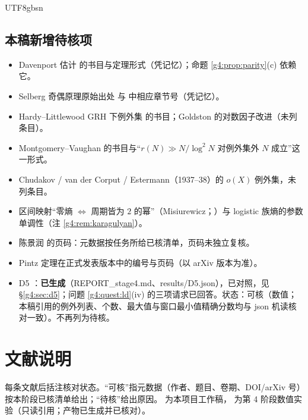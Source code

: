 \documentclass[11pt,a4paper]{article}
\theoremstyle{plain}
\theoremstyle{definition}
\begin{document}
\begin{CJK}{UTF8}{gbsn}
\subsection*{本稿新增待核项}
\begin{itemize}[leftmargin=*]
\item Davenport 估计 \cite{Dav37} 的书目与定理形式（凭记忆）；命题 \ref{g4:prop:parity}(c) 依赖它。
\item Selberg 奇偶原理原始出处 \cite{Sel49} 与 \cite{FI10} 中相应章节号（凭记忆）。
\item Hardy--Littlewood GRH 下例外集 \cite{HL24} 的书目；Goldston 的对数因子改进（未列条目）。
\item Montgomery--Vaughan \cite{MV75} 的书目与“$r(N)\gg N/\log^2N$ 对例外集外 $N$ 成立”这一形式。
\item Chudakov / van der Corput / Estermann（1937--38）的 $o(X)$ 例外集，未列条目。
\item 区间映射“零熵 $\iff$ 周期皆为 $2$ 的幂”（Misiurewicz；\cite{BC92}）与 logistic 族熵的参数单调性（注 \ref{g4:rem:karagulyan}）。
\item 陈景润 \cite{Chen73} 的页码：元数据按任务所给已核清单，页码未独立复核。
\item Pintz \cite{Pin18} 定理在正式发表版本中的编号与页码（以 arXiv 版本为准）。
\item D5 \cite{D5}：\textbf{已生成}（REPORT\_stage4.md、results/D5.json），已对照，见 \S\ref{g4:sec:d5}；问题 \ref{g4:quest:ld}(iv) 的三项请求已回答。状态：可核（数值；本稿引用的例外列表、个数、最大值与窗口最小值精确分数均与 json 机读核对一致）。不再列为待核。
\end{itemize}

\section*{文献说明}
每条文献后括注核对状态。“可核”指元数据（作者、题目、卷期、DOI/arXiv 号）按本阶段已核清单给出；“待核”给出原因。
\cite{G1,G2,G3} 为本项目工作稿，\cite{D5} 为第 4 阶段数值实验（只读引用；产物已生成并已核对）。


\end{CJK}
\end{document}
